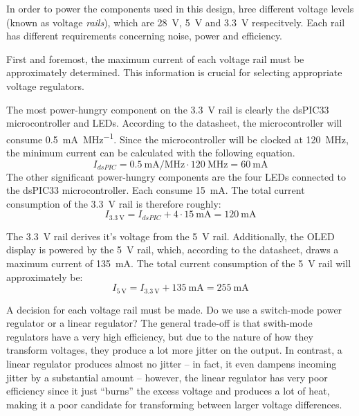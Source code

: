 In order to power the components used  in  this  design,  hree different voltage
levels (known as voltage \emph{rails}), which are  \SI{28}{\volt}, \SI{5}{\volt}
and   \SI{3.3}{\volt}   respecitvely.  Each  rail  has  different   requirements
concerning noise, power and efficiency.

First  and  foremost,  the  maximum  current  of  each   voltage  rail  must  be
approximately determined. This information is crucial for  selecting appropriate
voltage regulators.

The most  power-hungry  component  on  the  \SI{3.3}{\volt}  rail is clearly the
dsPIC33   microcontroller   and  LEDs.   According   to   the   datasheet,   the
microcontroller will  consume  \SI{0.5}{\milli\ampere\per\mega\hertz}. Since the
microcontroller will be clocked  at  \SI{120}{\mega\hertz},  the minimum current
can be calculated with the following equation.
\begin{equation}
    I_{dsPIC} = \SI{0.5}{\milli\ampere\per\mega\hertz} \cdot \SI{120}{\mega\hertz} = \SI{60}{\milli\ampere}
\end{equation}
The other significant power-hungry components are the four LEDs connected to the
dsPIC33 microcontroller. Each consume \SI{15}{\milli\ampere}. The total  current
consumption of the \SI{3.3}{\volt} rail is therefore roughly:
\begin{equation}
    I_{\SI{3.3}{\volt}} = I_{dsPIC} + 4 \cdot \SI{15}{\milli\ampere} = \SI{120}{\milli\ampere}
\end{equation}

The \SI{3.3}{\volt} rail  derives  it's  voltage  from  the  \SI{5}{\volt} rail.
Additionally,  the OLED display is powered by  the  \SI{5}{\volt}  rail,  which,
according to the datasheet, draws a maximum  current of \SI{135}{\milli\ampere}.
The total  current  consumption of the \SI{5}{\volt} rail will approximately be:
\begin{equation}
    I_{\SI{5}{\volt}} = I_{\SI{3.3}{\volt}} + \SI{135}{\milli\ampere} = \SI{255}{\milli\ampere}
\end{equation}

A  decision  for  each  voltage rail must be made. Do we use a switch-mode power
regulator  or a linear regulator?  The  general  trade-off  is  that  swith-mode
regulators have  a  very  high  efficiency,  but  due  to the nature of how they
transform voltages, they produce a lot more jitter on the output. In contrast, a
linear regulator produces almost  no jitter -- in fact, it even dampens incoming
jitter  by  a substantial amount -- however, the linear regulator has very  poor
efficiency since  it  just  ``burns''  the  excess voltage and produces a lot of
heat,  making  it  a  poor  candidate  for transforming between  larger  voltage
differences.

